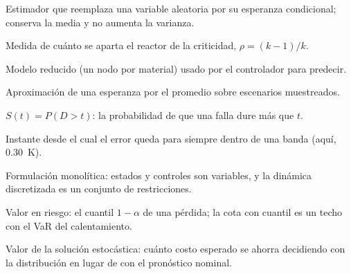 \begin{description}[style=nextline, leftmargin=0pt, itemsep=3pt]
  \item[Rao--Blackwell] Estimador que reemplaza una variable aleatoria por su esperanza
        condicional; conserva la media y no aumenta la varianza.
  \item[Reactividad] Medida de cuánto se aparta el reactor de la criticidad,
        $\rho=(k-1)/k$.
  \item[ROM] Modelo reducido (un nodo por material) usado por el controlador para predecir.
  \item[SAA] Aproximación de una esperanza por el promedio sobre escenarios muestreados.
  \item[Supervivencia] $S(t)=P(D>t)$: la probabilidad de que una falla dure más que $t$.
  \item[Tiempo de asentamiento] Instante desde el cual el error queda para siempre dentro de una
        banda (aquí, 0.30~K).
  \item[Transcripción directa] Formulación monolítica: estados y controles son variables, y la
        dinámica discretizada es un conjunto de restricciones.
  \item[VaR] Valor en riesgo: el cuantil $1-\alpha$ de una pérdida; la cota con cuantil es un
        techo con el VaR del calentamiento.
  \item[VSS] Valor de la solución estocástica: cuánto costo esperado se ahorra decidiendo con
        la distribución en lugar de con el pronóstico nominal.
\end{description}

